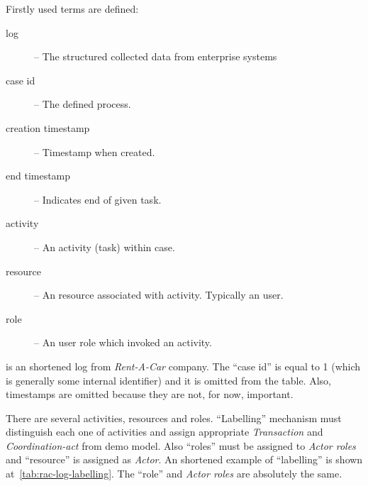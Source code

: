 Firstly used terms are defined:
\begin{description}
\item[log] -- The structured collected data from enterprise systems
\item[case id] -- The defined process.
\item[creation timestamp] -- Timestamp when created.
\item[end timestamp] -- Indicates end of given task.
\item[activity] -- An activity (task) within case.
\item[resource] -- An resource associated with activity. Typically an user.
\item[role] -- An user role which invoked an activity.
\end{description}

 is an shortened log from \textit{Rent-A-Car} company. The ``case id'' is equal to 1 (which is generally some internal identifier) and it is omitted from the table. Also, timestamps are omitted because they are not, for now, important.  

There are several activities, resources and roles. ``Labelling'' mechanism must distinguish each one of activities and assign appropriate \textit{Transaction} and \textit{Coordination-act} from \gls{demo} model. Also ``roles'' must be assigned to \textit{Actor roles} and ``resource'' is assigned as \textit{Actor}. An shortened example of ``labelling'' is shown at~\cref{tab:rac-log-labelling}. The ``role'' and \textit{Actor roles} are absolutely the same. 

